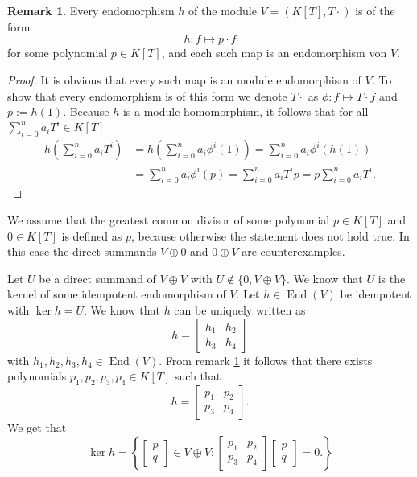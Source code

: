 \documentclass[a4paper,10pt]{article}
\theoremstyle{definition}
\newtheorem{rem}[own]{Remark}
\newcommand{\End}{\operatorname{End}}
\newcommand{\bvect}[1]{\begin{bmatrix}#1\end{bmatrix}}
\begin{document}
\section{}


\subsection{}
\begin{rem}\label{rem: endomorphisms K[T]}
 Every endomorphism $h$ of the module $V = (K[T], T \cdot)$ is of the form
 \[
  h : f \mapsto p \cdot f
 \]
 for some polynomial $p \in K[T]$, and each such map is an endomorphism von $V$.
\end{rem}
\begin{proof}
 It is obvious that every such map is an module endomorphism of $V$. To show that every endomorphism is of this form we denote $T \cdot$ as $\phi : f \mapsto T \cdot f$ and $p := h(1)$. Because $h$ is a module homomorphism, it follows that for all $\sum_{i=0}^n a_i T^i \in K[T]$
 \begin{align*}
  h\left( \sum_{i=0}^n a_i T^i \right)
  &= h\left( \sum_{i=0}^n a_i \phi^i(1) \right)
  = \sum_{i=0}^n a_i \phi^i (h(1)) \\
  &= \sum_{i=0}^n a_i \phi^i(p)
  = \sum_{i=0}^n a_i T^i p
  = p \sum_{i=0}^n a_i T^i.
 \end{align*}
\end{proof}

We assume that the greatest common divisor of some polynomial $p \in K[T]$ and $0 \in K[T]$ is defined as $p$, because otherwise the statement does not hold true. In this case the direct summands $V \oplus 0$ and $0 \oplus V$ are counterexamples.

Let $U$ be a direct summand of $V \oplus V$ with $U \not\in \{0, V \oplus V\}$. We know that $U$ is the kernel of some idempotent endomorphism of $V$. Let $h \in \End(V)$ be idempotent with $\ker h = U$. We know that $h$ can be uniquely written as
\[
 h =
 \begin{bmatrix}
  h_1 & h_2 \\
  h_3 & h_4
 \end{bmatrix}
\]
with $h_1, h_2, h_3, h_4 \in \End(V)$. From remark \ref{rem: endomorphisms K[T]} it follows that there exists polynomials $p_1, p_2, p_3, p_4 \in K[T]$ such that
\[
 h =
 \begin{bmatrix}
  p_1 & p_2 \\
  p_3 & p_4
 \end{bmatrix}.
\]
We get that
\[
 \ker h = \left\{ \bvect{p\\q} \in V \oplus V : 
 \begin{bmatrix}
  p_1 & p_2 \\
  p_3 & p_4
 \end{bmatrix}
 \bvect{p\\q}
 = 0.
 \right\}
\]
\end{document}
